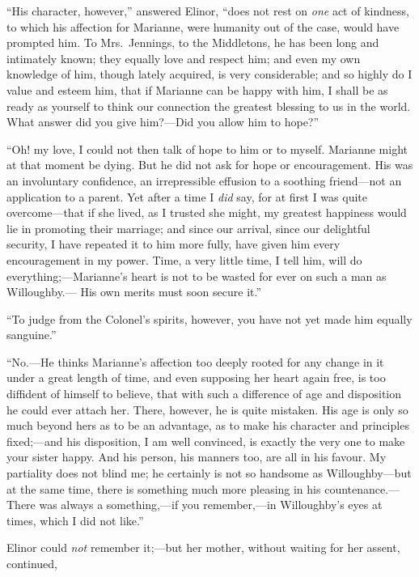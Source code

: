 ``His character, however,'' answered Elinor, ``does not rest
on \emph{one} act of kindness, to which his affection for Marianne,
were humanity out of the case, would have prompted him.
To Mrs.\ Jennings, to the Middletons, he has been long
and intimately known; they equally love and respect him;
and even my own knowledge of him, though lately acquired,
is very considerable; and so highly do I value and esteem him,
that if Marianne can be happy with him, I shall be as ready
as yourself to think our connection the greatest blessing
to us in the world.  What answer did you give him?---Did you
allow him to hope?''

``Oh! my love, I could not then talk of hope to him
or to myself.  Marianne might at that moment be dying.
But he did not ask for hope or encouragement.  His was
an involuntary confidence, an irrepressible effusion
to a soothing friend---not an application to a parent.
Yet after a time I \emph{did} say, for at first I was quite
overcome---that if she lived, as I trusted she might,
my greatest happiness would lie in promoting their marriage;
and since our arrival, since our delightful security,
I have repeated it to him more fully, have given him every
encouragement in my power.  Time, a very little time,
I tell him, will do everything;---Marianne's heart is
not to be wasted for ever on such a man as Willoughby.---%
His own merits must soon secure it.''

``To judge from the Colonel's spirits, however,
you have not yet made him equally sanguine.''

``No.---He thinks Marianne's affection too deeply
rooted for any change in it under a great length of time,
and even supposing her heart again free, is too diffident
of himself to believe, that with such a difference of age
and disposition he could ever attach her.  There, however,
he is quite mistaken.  His age is only so much beyond
hers as to be an advantage, as to make his character and
principles fixed;---and his disposition, I am well convinced,
is exactly the very one to make your sister happy.
And his person, his manners too, are all in his favour.
My partiality does not blind me; he certainly is not
so handsome as Willoughby---but at the same time,
there is something much more pleasing in his countenance.---%
There was always a something,---if you remember,---in Willoughby's
eyes at times, which I did not like.''

Elinor could \emph{not} remember it;---but her mother,
without waiting for her assent, continued,

